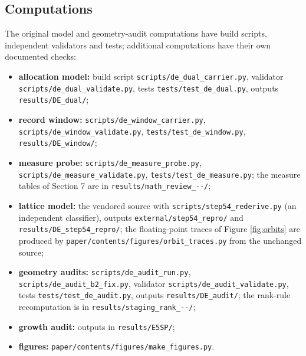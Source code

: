 \hypertarget{c.2-computations}{%
\subsection{Computations}\label{c.2-computations}}

The original model and geometry-audit computations have build scripts,
independent validators and tests; additional computations have their own
documented checks:

\begin{itemize}
\tightlist
\item
  \textbf{allocation model:} build script
  \texttt{scripts/\allowbreak de\_\allowbreak dual\_\allowbreak carrier.py}, validator
  \texttt{scripts/\allowbreak de\_\allowbreak dual\_\allowbreak validate.py}, tests
  \texttt{tests/\allowbreak test\_\allowbreak de\_\allowbreak dual.py}, outputs \texttt{results/\allowbreak DE\_\allowbreak dual/\allowbreak };
\item
  \textbf{record window:} \texttt{scripts/\allowbreak de\_\allowbreak window\_\allowbreak carrier.py},
  \texttt{scripts/\allowbreak de\_\allowbreak window\_\allowbreak validate.py},
  \texttt{tests/\allowbreak test\_\allowbreak de\_\allowbreak window.py}, \texttt{results/\allowbreak DE\_\allowbreak window/\allowbreak };
\item
  \textbf{measure probe:} \texttt{scripts/\allowbreak de\_\allowbreak measure\_\allowbreak probe.py},
  \texttt{scripts/\allowbreak de\_\allowbreak measure\_\allowbreak validate.py},
  \texttt{tests/\allowbreak test\_\allowbreak de\_\allowbreak measure.py}; the measure tables of Section 7
  are in \texttt{results/\allowbreak math\_\allowbreak review\_--/\allowbreak };
\item
  \textbf{lattice model:} the vendored source with
  \texttt{scripts/\allowbreak step54\_\allowbreak rederive.py} (an independent classifier),
  outputs \texttt{external/\allowbreak step54\_\allowbreak repro/\allowbreak } and
  \texttt{results/\allowbreak DE\_\allowbreak step54\_\allowbreak repro/\allowbreak }; the floating-point traces of
  Figure \ref{fig:orbits} are produced by
  \texttt{paper/\allowbreak contents/\allowbreak figures/\allowbreak orbit\_\allowbreak traces.py} from the unchanged
  source;
\item
  \textbf{geometry audits:} \texttt{scripts/\allowbreak de\_\allowbreak audit\_\allowbreak run.py},
  \texttt{scripts/\allowbreak de\_\allowbreak audit\_\allowbreak b2\_\allowbreak fix.py}, validator
  \texttt{scripts/\allowbreak de\_\allowbreak audit\_\allowbreak validate.py}, tests
  \texttt{tests/\allowbreak test\_\allowbreak de\_\allowbreak audit.py}, outputs
  \texttt{results/\allowbreak DE\_\allowbreak audit/\allowbreak }; the rank-rule recomputation is in
  \texttt{results/\allowbreak staging\_\allowbreak rank\_--/\allowbreak };
\item
  \textbf{growth audit:} outputs in \texttt{results/\allowbreak E5SP/\allowbreak };
\item
  \textbf{figures:} \texttt{paper/\allowbreak contents/\allowbreak figures/\allowbreak make\_\allowbreak figures.py}.
\end{itemize}

